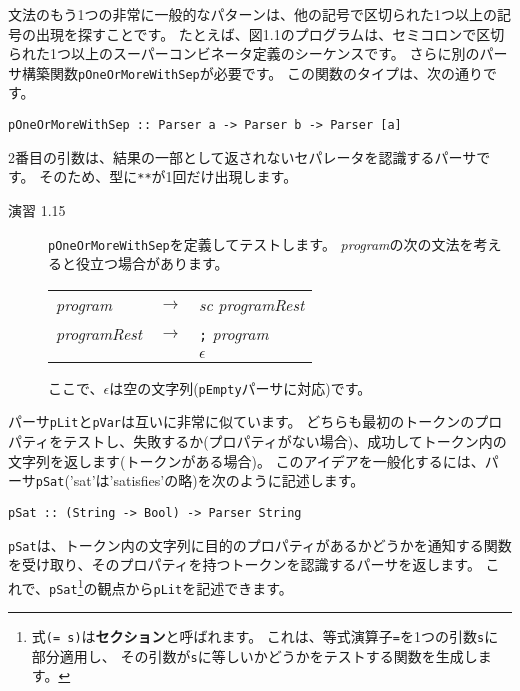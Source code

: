 \documentclass{jarticle}
\begin{document}
文法のもう1つの非常に一般的なパターンは、他の記号で区切られた1つ以上の記号の出現を探すことです。
たとえば、図1.1のプログラムは、セミコロンで区切られた1つ以上のスーパーコンビネータ定義のシーケンスです。
さらに別のパーサ構築関数\texttt{pOneOrMoreWithSep}が必要です。
この関数のタイプは、次の通りです。
\begin{verbatim}
pOneOrMoreWithSep :: Parser a -> Parser b -> Parser [a]
\end{verbatim}
2番目の引数は、結果の一部として返されないセパレータを認識するパーサです。
そのため、型に\texttt{**}が1回だけ出現します。

\begin{description}
	\item[演習 1.15] \texttt{pOneOrMoreWithSep}を定義してテストします。
		\textit{program}の次の文法を考えると役立つ場合があります。

		\begin{center}
			\begin{tabular} {l c l}
				\textit{program}     & $\rightarrow$ & \textit{sc} \textit{programRest} \\
				\textit{programRest} & $\rightarrow$ & \texttt{;} \textit{program}      \\
				                     & \textbar      & $\epsilon$
			\end{tabular}
		\end{center}

		ここで、$\epsilon$は空の文字列(\texttt{pEmpty}パーサに対応)です。
\end{description}

パーサ\texttt{pLit}と\texttt{pVar}は互いに非常に似ています。
どちらも最初のトークンのプロパティをテストし、失敗するか(プロパティがない場合)、成功してトークン内の文字列を返します(トークンがある場合)。
このアイデアを一般化するには、パーサ\texttt{pSat}('sat'は'satisfies'の略)を次のように記述します。

\begin{verbatim}
pSat :: (String -> Bool) -> Parser String
\end{verbatim}

\texttt{pSat}は、トークン内の文字列に目的のプロパティがあるかどうかを通知する関数を受け取り、そのプロパティを持つトークンを認識するパーサを返します。
これで、\texttt{pSat}\footnote{式\texttt{(= s)}は\textbf{セクション}と呼ばれます。
	これは、等式演算子\texttt{=}を1つの引数\texttt{s}に部分適用し、
	その引数が\texttt{s}に等しいかどうかをテストする関数を生成します。}の観点から\texttt{pLit}を記述できます。
\end{document}
